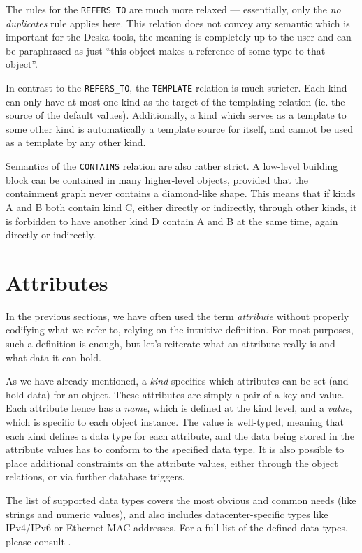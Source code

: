 \documentclass[deska]{subfiles}
\begin{document}
The rules for the {\tt REFERS\_TO} are much more relaxed --- essentially, only the {\em no duplicates} rule applies here.
This relation does not convey any semantic which is important for the Deska tools, the meaning is completely up to the
user and can be paraphrased as just ``this object makes a reference of some type to that object''.

In contrast to the {\tt REFERS\_TO}, the {\tt TEMPLATE} relation is much stricter.  Each kind can only have at most one
kind as the target of the templating relation (ie. the source of the default values).  Additionally, a kind which serves
as a template to some other kind is automatically a template source for itself, and cannot be used as a template by any
other kind.

Semantics of the {\tt CONTAINS} relation are also rather strict.  A low-level building block can be contained in many
higher-level objects, provided that the containment graph never contains a diamond-like shape.  This means that if kinds
A and B both contain kind C, either directly or indirectly, through other kinds, it is forbidden to have another kind D
contain A and B at the same time, again directly or indirectly.

\section{Attributes}

In the previous sections, we have often used the term {\em attribute} without properly codifying what we refer to,
relying on the intuitive definition.  For most purposes, such a definition is enough, but let's reiterate what an
attribute really is and what data it can hold.

As we have already mentioned, a {\em kind} specifies which attributes can be set (and hold data) for an object.  These
attributes are simply a pair of a key and value.  Each attribute hence has a {\em name}, which is defined at the kind
level, and a {\em value}, which is specific to each object instance.  The value is well-typed, meaning that each kind
defines a data type for each attribute, and the data being stored in the attribute values has to conform to the
specified data type.  It is also possible to place additional constraints on the attribute values, either through the
object relations, or via further database triggers.

The list of supported data types covers the most obvious and common needs (like strings and numeric values), and also
includes datacenter-specific types like IPv4/IPv6 or Ethernet MAC addresses.  For a full list of the defined data types,
please consult .
\end{document}
